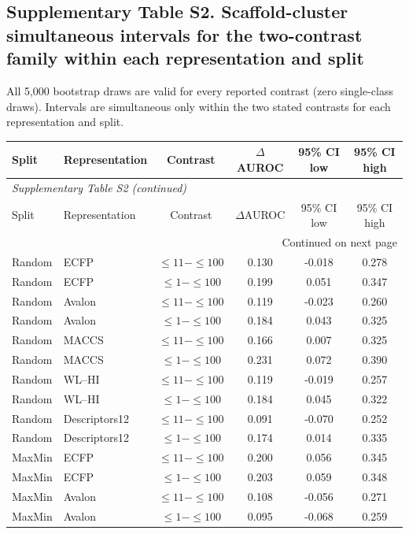 \subsection*{Supplementary Table S2. Scaffold-cluster simultaneous intervals for the two-contrast family within each representation and split}
All 5,000 bootstrap draws are valid for every reported contrast (zero single-class draws). Intervals are simultaneous only within the two stated contrasts for each representation and split.
\begin{longtable}{llcccc}

\toprule Split & Representation & Contrast & $\Delta$AUROC & 95\% CI low & 95\% CI high \\ \midrule\endfirsthead
\multicolumn{6}{l}{\textit{Supplementary Table S2 (continued)}} \\
\toprule Split & Representation & Contrast & $\Delta$AUROC & 95\% CI low & 95\% CI high \\ \midrule\endhead
\midrule\multicolumn{6}{r}{Continued on next page}\\\endfoot
\bottomrule\endlastfoot
Random & ECFP & $\leq11-\leq100$ & 0.130 & -0.018 & 0.278 \\
Random & ECFP & $\leq1-\leq100$ & 0.199 & 0.051 & 0.347 \\
Random & Avalon & $\leq11-\leq100$ & 0.119 & -0.023 & 0.260 \\
Random & Avalon & $\leq1-\leq100$ & 0.184 & 0.043 & 0.325 \\
Random & MACCS & $\leq11-\leq100$ & 0.166 & 0.007 & 0.325 \\
Random & MACCS & $\leq1-\leq100$ & 0.231 & 0.072 & 0.390 \\
Random & WL--HI & $\leq11-\leq100$ & 0.119 & -0.019 & 0.257 \\
Random & WL--HI & $\leq1-\leq100$ & 0.184 & 0.045 & 0.322 \\
Random & Descriptors12 & $\leq11-\leq100$ & 0.091 & -0.070 & 0.252 \\
Random & Descriptors12 & $\leq1-\leq100$ & 0.174 & 0.014 & 0.335 \\
\addlinespace
MaxMin & ECFP & $\leq11-\leq100$ & 0.200 & 0.056 & 0.345 \\
MaxMin & ECFP & $\leq1-\leq100$ & 0.203 & 0.059 & 0.348 \\
MaxMin & Avalon & $\leq11-\leq100$ & 0.108 & -0.056 & 0.271 \\
MaxMin & Avalon & $\leq1-\leq100$ & 0.095 & -0.068 & 0.259 \\

\end{longtable}
